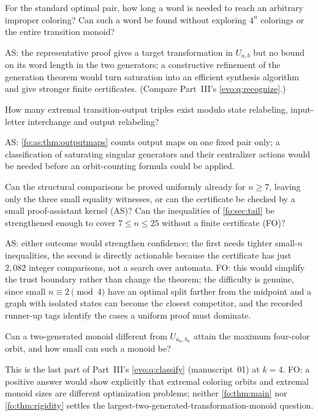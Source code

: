 \documentclass[11pt,a4paper]{article}
\numberwithin{equation}{section}
\theoremstyle{definition}
\theoremstyle{remark}
\begin{document}
\begin{question}\label{fo:as:q:words}
For the standard optimal pair, how long a word is needed to reach an arbitrary
improper coloring? Can such a word be found without exploring $4^n$ colorings
or the entire transition monoid?
\end{question}
AS: the representative proof gives a target transformation in $U_{a,b}$ but no
bound on its word length in the two generators; a constructive refinement of
the generation theorem would turn saturation into an efficient synthesis
algorithm and give stronger finite certificates. (Compare Part~III's
\cref{evo:q:recognize}.)

\begin{question}\label{fo:as:q:enumerate}
How many extremal transition-output triples exist modulo state relabeling,
input-letter interchange and output relabeling?
\end{question}
AS: \cref{fo:as:thm:outputmaps} counts output maps on one fixed pair only;
a classification of saturating singular generators and their centralizer
actions would be needed before an orbit-counting formula could be applied.

\begin{question}\label{fo:q:computation}
Can the structural comparisons be proved uniformly already for $n\ge7$, leaving
only the three small equality witnesses, or can the certificate be checked by
a small proof-assistant kernel (AS)? Can the inequalities of
\cref{fo:sec:tail} be strengthened enough to cover $7\le n\le25$ without a
finite certificate (FO)?
\end{question}
AS: either outcome would strengthen confidence; the first needs tighter
small-$n$ inequalities, the second is directly actionable because the
certificate has just $2{,}082$ integer comparisons, not a search over automata.
FO: this would simplify the trust boundary rather than change the theorem; the
difficulty is genuine, since small $n\equiv2\pmod4$ have an optimal split
farther from the midpoint and a graph with isolated states can become the
closest competitor, and the recorded runner-up tags identify the cases a
uniform proof must dominate.

\begin{question}\label{fo:fo:q:monoids}
Can a two-generated monoid different from $U_{a_n,b_n}$ attain the maximum
four-color orbit, and how small can such a monoid be?
\end{question}
This is the last part of Part~III's \cref{evo:q:classify} (manuscript~01) at
$k=4$. FO: a positive answer would show explicitly that extremal coloring
orbits and extremal monoid sizes are different optimization problems; neither
\cref{fo:thm:main} nor \cref{fo:thm:rigidity} settles the
largest-two-generated-transformation-monoid question.
\end{document}
